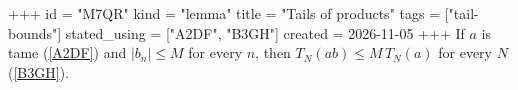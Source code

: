 +++
id = "M7QR"
kind = "lemma"
title = "Tails of products"
tags = ["tail-bounds"]
stated_using = ["A2DF", "B3GH"]
created = 2026-11-05
+++
If $a$ is tame (\ref{A2DF}) and $|b_n| \le M$ for every $n$, then $T_N(ab) \le M \, T_N(a)$ for every $N$ (\ref{B3GH}).
